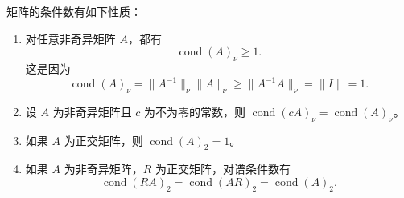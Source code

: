 矩阵的条件数有如下性质：
\begin{enumerate}
\item 对任意非奇异矩阵 $A$，都有
\begin{equation}
\operatorname{cond}(A)_\nu\ge1.
\tag{3.2.15}
\end{equation}
这是因为
\[
\operatorname{cond}(A)_\nu=\|A^{-1}\|_\nu\|A\|_\nu
\ge\|A^{-1}A\|_\nu=\|I\|=1.
\]
\item 设 $A$ 为非奇异矩阵且 $c$ 为不为零的常数，则 $\operatorname{cond}(cA)_\nu=\operatorname{cond}(A)_\nu$。
\item 如果 $A$ 为正交矩阵，则 $\operatorname{cond}(A)_2=1$。
\item 如果 $A$ 为非奇异矩阵，$R$ 为正交矩阵，对谱条件数有
\[
\operatorname{cond}(RA)_2=\operatorname{cond}(AR)_2=\operatorname{cond}(A)_2.
\]
\end{enumerate}

